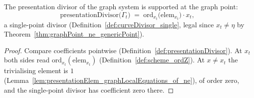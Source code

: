 \begin{theorem}
  \label{thm:presentationDivisor_graphLocalEquations}
  \leanok
  The presentation divisor of the graph system is supported at the graph point:
  \[
    \mathrm{presentationDivisor}\bigl(\Gamma_t\bigr)
      \;=\; \mathrm{ord}_{x_t}\bigl(\mathrm{elem}_{x_t}\bigr) \cdot x_t ,
  \]
  a single-point divisor (Definition~\ref{def:curveDivisor_single}, legal since
  \(x_t \neq \eta\) by Theorem~\ref{thm:graphPoint_ne_genericPoint}).
\end{theorem}
\begin{proof}
  \leanok
  Compare coefficients pointwise (Definition~\ref{def:presentationDivisor}). At \(x_t\)
  both sides read \(\mathrm{ord}_{x_t}(\mathrm{elem}_{x_t})\)
  (Definition~\ref{def:scheme_ordZ}). At \(x \neq x_t\) the trivialising element is \(1\)
  (Lemma~\ref{lem:presentationElem_graphLocalEquations_of_ne}), of order zero, and the
  single-point divisor has coefficient zero there.
\end{proof}

